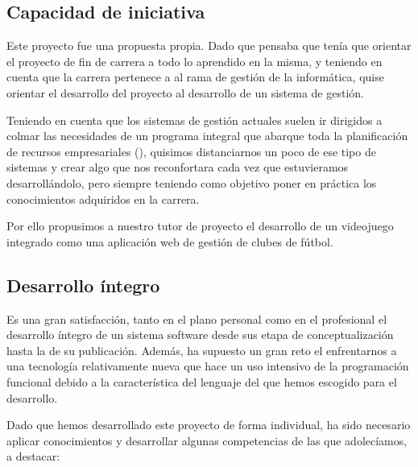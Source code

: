 \subsection{Capacidad de iniciativa}
Este proyecto fue una propuesta propia. Dado que pensaba que tenía que orientar
el proyecto de fin de carrera a todo lo aprendido en la misma, y teniendo en
cuenta que la carrera pertenece a al rama de gestión de la informática, quise
orientar el desarrollo del proyecto al desarrollo de un sistema de gestión.

Teniendo en cuenta que los sistemas de gestión actuales suelen ir dirigidos a
colmar las necesidades de un programa integral que abarque toda la planificación
de recursos empresariales (), quisimos distanciarnos un poco de ese
tipo de sistemas y crear algo que nos reconfortara cada vez que estuvieramos
desarrollándolo, pero siempre teniendo como objetivo poner en práctica los
conocimientos adquiridos en la carrera.

Por ello propusimos a nuestro tutor de proyecto el desarrollo de un videojuego
integrado como una aplicación web de gestión de clubes de fútbol.

\subsection{Desarrollo íntegro}
Es una gran satisfacción, tanto en el plano personal como en el profesional el
desarrollo íntegro de un sistema software desde sus etapa de conceptualización
hasta la de su publicación. Además, ha supuesto un gran reto el enfrentarnos a
una tecnología relativamente nueva que hace un uso intensivo de la programación
funcional debido a la característica del lenguaje del  que
hemos escogido para el desarrollo.

Dado que hemos desarrollado este proyecto de forma individual, ha sido necesario
aplicar conocimientos y desarrollar algunas competencias de las que adolecíamos,
a destacar:

